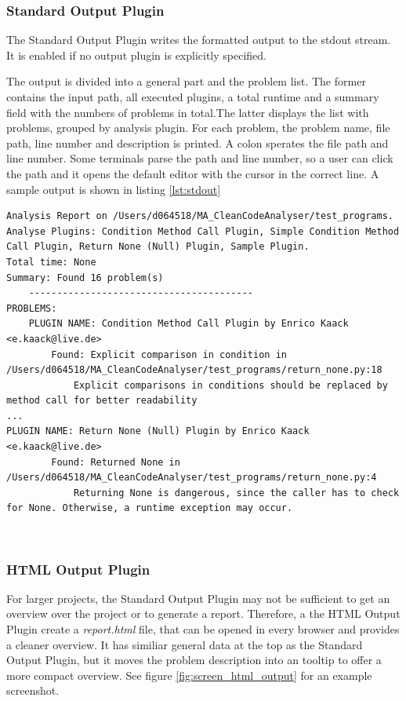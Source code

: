 \subsubsection{Standard Output Plugin}
The Standard Output Plugin writes the formatted output to the stdout stream. It is enabled if no output plugin is explicitly specified. 

The output is divided into a general part and the problem list. The former contains the input path, all executed plugins, a total runtime and a summary field with the numbers of problems in total.The latter displays the list with problems, grouped by analysis plugin.  
For each problem, the problem name, file path, line number and description is printed. A colon sperates the file path and line number. Some terminals parse the path and line number, so a user can click the path and it opens the default editor with the cursor in the correct line. A sample output is shown in listing \ref{lst:stdout}

\begin{lstlisting}[label=lst:stdout]
Analysis Report on /Users/d064518/MA_CleanCodeAnalyser/test_programs.
Analyse Plugins: Condition Method Call Plugin, Simple Condition Method Call Plugin, Return None (Null) Plugin, Sample Plugin.
Total time: None
Summary: Found 16 problem(s)
    ----------------------------------------
PROBLEMS:
    PLUGIN NAME: Condition Method Call Plugin by Enrico Kaack <e.kaack@live.de>
        Found: Explicit comparison in condition in /Users/d064518/MA_CleanCodeAnalyser/test_programs/return_none.py:18
            Explicit comparisons in conditions should be replaced by method call for better readability
...
PLUGIN NAME: Return None (Null) Plugin by Enrico Kaack <e.kaack@live.de>
        Found: Returned None in /Users/d064518/MA_CleanCodeAnalyser/test_programs/return_none.py:4
            Returning None is dangerous, since the caller has to check for None. Otherwise, a runtime exception may occur.
\end{lstlisting} 

\subsubsection{HTML Output Plugin}
For larger projects, the Standard Output Plugin may not be sufficient to get an overview over the project or to generate a report. Therefore, a the HTML Output Plugin create a \textit{report.html} file, that can be opened in every browser and provides a cleaner overview. It has similiar general data at the top as the Standard Output Plugin, but it moves the problem description into an tooltip to offer a more compact overview. See figure \ref{fig:screen_html_output} for an example screenshot.

